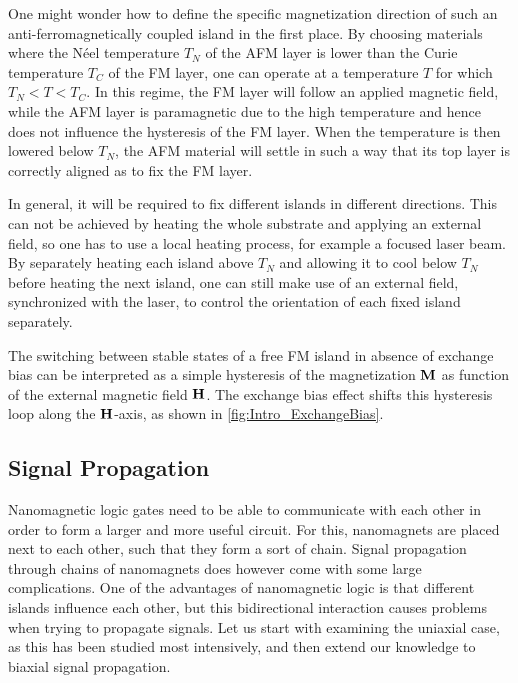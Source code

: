 \documentclass[12pt,a4paper]{article}
\begin{document}
One might wonder how to define the specific magnetization direction of such an anti-ferromagnetically coupled island in the first place. By choosing materials where the N\'{e}el temperature $T_N$ of the AFM layer is lower than the Curie temperature $T_C$ of the FM layer, one can operate at a temperature $T$ for which $T_N < T < T_C$. In this regime, the FM layer will follow an applied magnetic field, while the AFM layer is paramagnetic due to the high temperature and hence does not influence the hysteresis of the FM layer. When the temperature is then lowered below $T_N$, the AFM material will settle in such a way that its top layer is correctly aligned as to fix the FM layer.~\cite{ExchangeBias_Mechanisms} \par
In general, it will be required to fix different islands in different directions. This can not be achieved by heating the whole substrate and applying an external field, so one has to use a local heating process, for example a focused laser beam. By separately heating each island above $T_N$ and allowing it to cool below $T_N$ before heating the next island, one can still make use of an external field, synchronized with the laser, to control the orientation of each fixed island separately. \par
The switching between stable states of a free FM island in absence of exchange bias can be interpreted as a simple hysteresis of the magnetization $\vb{M}$ as function of the external magnetic field $\vb{H}$. The exchange bias effect shifts this hysteresis loop along the $\vb{H}$-axis, as shown in \cref{fig:Intro_ExchangeBias}. %

\subsection{Signal Propagation}
Nanomagnetic logic gates need to be able to communicate with each other in order to form a larger and more useful circuit. For this, nanomagnets are placed next to each other, such that they form a sort of chain. Signal propagation through chains of nanomagnets does however come with some large complications. One of the advantages of nanomagnetic logic is that different islands influence each other, but this bidirectional interaction causes problems when trying to propagate signals. Let us start with examining the uniaxial case, as this has been studied most intensively, and then extend our knowledge to biaxial signal propagation.
\end{document}
